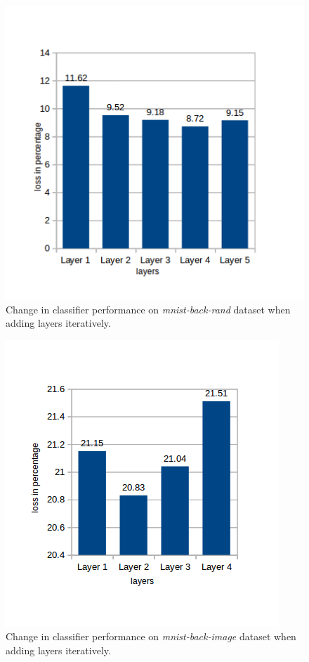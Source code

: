 \begin{figure}
  \centering
  \captionsetup{justification=centering,margin=0.1cm}
  \includegraphics[scale=0.8]{figures/mlmkl_rand}
  \caption{Change in classifier performance on \textit{mnist-back-rand} dataset when adding layers iteratively.}
  \label{fig_mbr_layers}
\end{figure}

\begin{figure}
  \centering
  \captionsetup{justification=centering,margin=0.1cm}
  \includegraphics[scale=0.8]{figures/mlmkl_image}
  \caption{Change in classifier performance on \textit{mnist-back-image} dataset when adding layers iteratively.}
  \label{fig_mbi_layers}
\end{figure}

